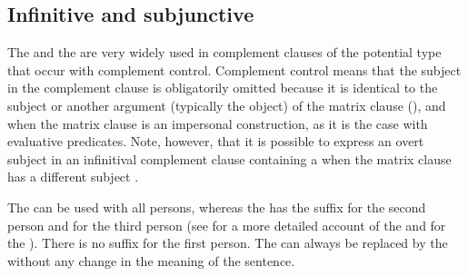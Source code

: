 
\subsection{Infinitive and subjunctive}
\label{ssec:Infinitive and subjunctive}

The  and the  are very widely used in complement clauses of the potential type that occur with complement control. Complement control means that the subject in the complement clause is obligatorily omitted because it is identical to the subject or another argument (typically the object) of the matrix clause (), and when the matrix clause is an impersonal construction, as it is the case with evaluative predicates. Note, however, that it is possible to express an overt subject in an infinitival complement clause containing a  when the matrix clause has a different subject .

The  can be used with all persons, whereas the  has the suffix  for the second person and  for the third person (see  for a more detailed account of the  and  for the ). There is no  suffix for the first person. The  can always be replaced by the  without any change in the meaning of the sentence.

